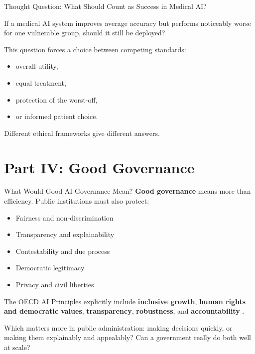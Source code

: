 \documentclass[aspectratio=169,11pt]{beamer}
\begin{document}
\begin{frame}{Thought Question: What Should Count as Success in Medical AI?}
\begin{discussionbox}
\scriptsize
If a medical AI system improves average accuracy but performs noticeably worse for one vulnerable group, should it still be deployed?
\end{discussionbox}

\vspace{0.2cm}
This question forces a choice between competing standards:
\begin{itemize}
    \item overall utility,
    \item equal treatment,
    \item protection of the worst-off,
    \item or informed patient choice.
\end{itemize}

\vspace{0.2cm}
Different ethical frameworks give different answers.
\end{frame}

\section{Part IV: Good Governance}

\begin{frame}{What Would Good AI Governance Mean?}
\textbf{Good governance} means more than efficiency. Public institutions must also protect:
\begin{itemize}
    \item Fairness and non-discrimination
    \item Transparency and explainability
    \item Contestability and due process
    \item Democratic legitimacy
    \item Privacy and civil liberties
\end{itemize}

\vspace{0.2cm}
The OECD AI Principles explicitly include \textbf{inclusive growth}, \textbf{human rights and democratic values}, \textbf{transparency}, \textbf{robustness}, and \textbf{accountability} \parencite{oecd_ai_principles_2024}.

\vspace{0.2cm}
\begin{discussionbox}
\scriptsize
Which matters more in public administration: making decisions quickly, or making them explainably and appealably? Can a government really do both well at scale?
\end{discussionbox}
\end{frame}
\end{document}

